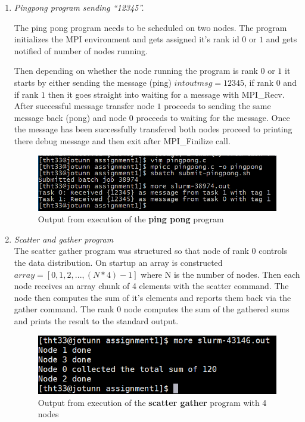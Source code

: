 \documentclass[fontsize=14pt,a4paper]{scrartcl}
\begin{document}
\begin{enumerate}
\begin{enumerate}[label*=\arabic*.]
    \item
    \textit{Pingpong program sending ``12345''.}
    
    The ping pong program needs to be scheduled on two nodes. The program initializes the MPI environment and gets assigned it's rank id $0$ or $1$ and gets notified of number of nodes running.

    Then depending on whether the node running the program is rank $0$ or $1$ it starts by either sending the message (ping) $int outmsg=12345$, if rank $0$ and if rank $1$ then it goes straight into waiting for a message with MPI\_Recv. After successful message transfer node $1$ proceeds to sending the same message back (pong) and node $0$ proceeds to waiting for the message. Once the message has been successfully transfered both nodes proceed to printing there debug message and then exit after MPI\_Finilize call.
    \begin{figure}[H]
        \centering
        \includegraphics[scale=0.8]{Images/Pingpong}
        \caption{Output from execution of the \textbf{ping pong} program}
    \end{figure}

    \item
    \textit{Scatter and gather program}\\
    The scatter gather program was structured so that node of rank 0 controls the data distribution. On startup an array is constructed $array = [0, 1, 2, ..., (N * 4) - 1]$ where N is the number of nodes. Then each node receives an array chunk of 4 elements with the scatter command. The node then computes the sum of it’s elements and reports them back via the gather command. The rank 0 node computes the sum of the gathered sums and prints the result to the standard output.
    \begin{figure}[H]
        \centering
        \includegraphics[scale=0.8]{Images/ScatterGather}
        \caption{Output from execution of the \textbf{scatter gather} program with 4 nodes}
    \end{figure}


\end{enumerate}
\end{enumerate}
\end{document}
